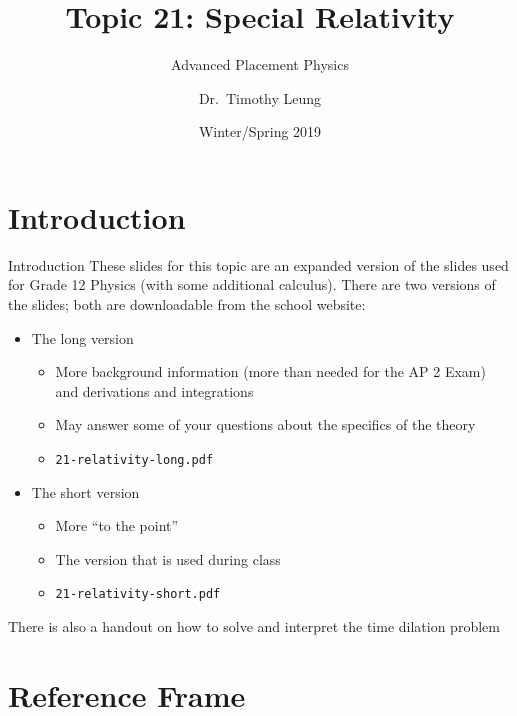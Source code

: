 \documentclass[12pt,compress,aspectratio=169]{beamer}
\title{Topic 21: Special Relativity}
\subtitle{Advanced Placement Physics}
\author[TML]{Dr.\ Timothy Leung}
\institute{Olympiads School}
\date{Winter/Spring 2019}
\begin{document}
\begin{frame}
  \maketitle
\end{frame}



\section[Intro]{Introduction}

\begin{frame}{Introduction}
  These slides for this topic are an expanded version of the slides used for
  Grade 12 Physics (with some additional calculus). There are two versions of
  the slides; both are downloadable from the school website:
  \begin{itemize}
  \item The long version
    \begin{itemize}
    \item More background information (more than needed for the AP 2 Exam) and
      derivations and integrations
    \item May answer some of your questions about the specifics of the theory
    \item \texttt{21-relativity-long.pdf}
    \end{itemize}
  \item The short version
    \begin{itemize}
    \item More ``to the point''
    \item The version that is used during class
    \item \texttt{21-relativity-short.pdf}
    \end{itemize}
  \end{itemize}
  There is also a handout on how to solve and interpret the time dilation
  problem
\end{frame}


\section{Reference Frame}
\end{document}
